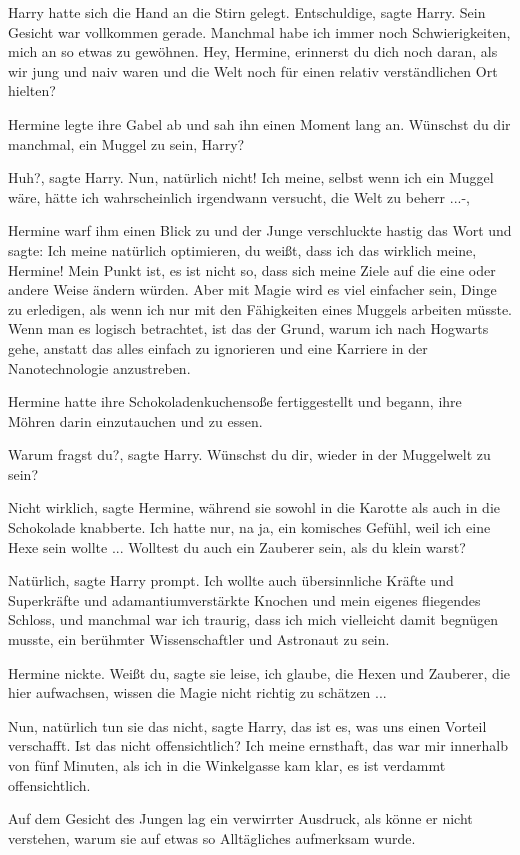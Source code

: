 Harry hatte sich die Hand an die Stirn gelegt. \glqq{}Entschuldige\grqq{}, sagte
Harry. Sein Gesicht war vollkommen gerade. \glqq{}Manchmal habe ich immer noch
Schwierigkeiten, mich an so etwas zu gewöhnen. Hey, Hermine, erinnerst du dich
noch daran, als wir jung und naiv waren und die Welt noch für einen relativ
verständlichen Ort hielten?\grqq{}

Hermine legte ihre Gabel ab und sah ihn einen Moment lang an. \glqq{}Wünschst du
dir manchmal, ein Muggel zu sein, Harry?\grqq{}

\glqq{}Huh?\grqq{}, sagte Harry. \glqq{}Nun, natürlich nicht! Ich meine, selbst
wenn ich ein Muggel wäre, hätte ich wahrscheinlich irgendwann versucht, die Welt
zu beherr ...-\grqq{},

Hermine warf ihm einen Blick zu und der Junge verschluckte hastig das Wort und
sagte: \glqq{}Ich meine natürlich optimieren, du weißt, dass ich das wirklich
meine, Hermine! Mein Punkt ist, es ist nicht so, dass sich meine Ziele auf die
eine oder andere Weise ändern würden. Aber mit Magie wird es viel einfacher
sein, Dinge zu erledigen, als wenn ich nur mit den Fähigkeiten eines Muggels
arbeiten müsste. Wenn man es logisch betrachtet, ist das der Grund, warum ich
nach Hogwarts gehe, anstatt das alles einfach zu ignorieren und eine Karriere in
der Nanotechnologie anzustreben.\grqq{}

Hermine hatte ihre Schokoladenkuchensoße fertiggestellt und begann, ihre Möhren
darin einzutauchen und zu essen.

\glqq{}Warum fragst du?\grqq{}, sagte Harry. \glqq{}Wünschst du dir, wieder in der
Muggelwelt zu sein?\grqq{}

\glqq{}Nicht wirklich\grqq{}, sagte Hermine, während sie sowohl in die Karotte
als auch in die Schokolade knabberte. \glqq{}Ich hatte nur, na ja, ein komisches
Gefühl, weil ich eine Hexe sein wollte ... Wolltest du auch ein Zauberer sein,
als du klein warst?\grqq{}

\glqq{}Natürlich\grqq{}, sagte Harry prompt. \glqq{}Ich wollte auch übersinnliche
Kräfte und Superkräfte und adamantiumverstärkte Knochen und mein eigenes
fliegendes Schloss, und manchmal war ich traurig, dass ich mich vielleicht damit
begnügen musste, ein berühmter Wissenschaftler und Astronaut zu sein.\grqq{}

Hermine nickte. \glqq{}Weißt du\grqq{}, sagte sie leise, \glqq{}ich glaube, die
Hexen und Zauberer, die hier aufwachsen, wissen die Magie nicht richtig zu
schätzen ...\grqq{}

\glqq{}Nun, natürlich tun sie das nicht\grqq{}, sagte Harry, \glqq{}das ist es,
was uns einen Vorteil verschafft. Ist das nicht offensichtlich? Ich meine
ernsthaft, das war mir innerhalb von fünf Minuten, als ich in die Winkelgasse
kam klar, es ist verdammt offensichtlich.\grqq{}

Auf dem Gesicht des Jungen lag ein verwirrter Ausdruck, als könne er nicht
verstehen, warum sie auf etwas so Alltägliches aufmerksam wurde.

